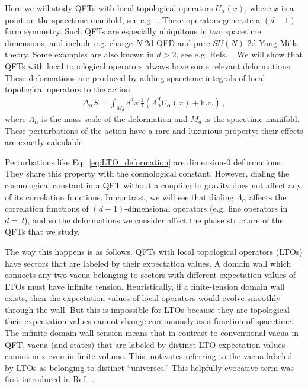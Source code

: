 \documentclass[11pt]{article}
\def\tfrac#1#2{{\textstyle{\frac{#1}{#2}}}}
\def\a{{\alpha}}
\begin{document}
Here we will study QFTs with local topological operators $U_\a(x)$, where $x$ is
a point on the spacetime manifold, see
e.g.~\cite{Pantev:2005rh,Hellerman:2006zs,Sharpe:2015mja,
Komargodski:2017dmc,Anber:2018jdf,
Anber:2018xek,Armoni:2018bga,Cherman:2019hbq,Tanizaki:2019rbk,Misumi:2019dwq,Hidaka:2019mfm,Eager:2020rra,
Komargodski:2020mxz,Brennan:2020ehu,Hidaka:2020iaz,Hidaka:2020izy,Cherman:2020cvw,Robbins:2021ylj,Hidaka:2021mml,Hidaka:2021kkf, Nguyen:2021naa,Sharpe:2021srf}. These operators generate a $(d-1)$-form symmetry.
Such QFTs are especially ubiquitous in two spacetime
dimensions, and include e.g. charge-$N$ 2d QED and pure $SU(N)$ 2d Yang-Mills
theory.  Some examples are also known in $d>2$, see e.g. Refs.~\cite{Tanizaki:2019rbk,Cherman:2020cvw}.
We will show that QFTs with local topological
operators always have some relevant deformations.  These deformations are
produced by adding spacetime integrals of local topological operators to the
action
\begin{align}
    \Delta_{\a} S = \int_{M_d} d^dx\, \tfrac{1}{2}  \left(\Lambda_\a^d U_\a(x)+\text{h.c.}\right) \,,
    \label{eq:LTO_deformation}
\end{align}
where $\Lambda_\a$ is the mass scale of the deformation and $M_d$ is the spacetime
manifold.  These perturbations of the action have a rare and luxurious property:
their effects are exactly calculable.   

Perturbations like
Eq.~\eqref{eq:LTO_deformation} are dimension-$0$ deformations. They share this
property with the cosmological constant.  However, dialing the cosmological
constant in a QFT without a coupling to gravity does not affect any of its correlation
functions.  In contrast, we will see that dialing $\Lambda_\a$ affects the
correlation functions of $(d-1)$-dimensional operators (e.g. line operators in $d=2$),
and so the deformations we consider affect the phase structure of the QFTs that we study.

The way this happens is as follows.  QFTs with local topological operators
(LTOs) have sectors that are labeled by their expectation values. A domain wall
which connects any two vacua belonging to sectors with different expectation
values of LTOs must have infinite tension. Heuristically, if a finite-tension
domain wall exists, then the expectation values of local operators would evolve
smoothly through the wall.  But this is impossible for LTOs because they are
topological --- their expectation values cannot change continuously as a
function of spacetime.  The infinite domain wall tension means that in contrast
to conventional vacua in QFT, vacua (and states) that are labeled by distinct LTO expectation values
cannot mix even in finite volume.  This motivates referring to the vacua labeled
by LTOs as belonging to distinct ``universes.''  This helpfully-evocative term was first introduced in Ref.~\cite{Hellerman:2006zs}. 
\end{document}
